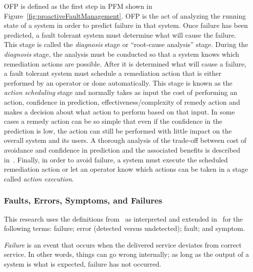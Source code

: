 
\ac{OFP} is defined as the first step in \ac{PFM} shown in
Figure~\ref{fig:proactiveFaultManagement}.  \ac{OFP} is the act of analyzing
the running state of a system in order to predict failure in that system. Once
failure has been predicted, a fault tolerant system must determine what will
cause the failure.  This stage is called the \emph{diagnosis} stage or
``root-cause analysis'' stage.  During the \emph{diagnosis} stage, the analysis
must be conducted so that a system knows which remediation actions are
possible.  After it is determined what will cause a failure, a fault tolerant
system must schedule a remediation action that is either performed by an
operator or done automatically.  This stage is known as the \emph{action
scheduling} stage and normally takes as input the cost of performing an action,
confidence in prediction, effectiveness/complexity of remedy action and makes a
decision about what action to perform based on that input.  In some cases a
remedy action can be so simple that even if the confidence in the prediction is
low, the action can still be performed with little impact on the overall system
and its users.  A thorough analysis of the trade-off between cost of avoidance
and confidence in prediction and the associated benefits is described
in~\cite{candea2004microreboot}.  Finally, in order to avoid failure, a system
must execute the scheduled remediation action or let an operator know which
actions can be taken in a stage called \emph{action execution}.

\subsubsection{Faults, Errors, Symptoms, and Failures}
This research uses the definitions from~\cite{avivzienis2004basic} as
interpreted and extended in~\cite{salfnerSurvey} for the following terms:
failure; error (detected versus undetected); fault; and symptom.

\emph{Failure} is an event that occurs when the delivered service deviates from
correct service.  In other words, things can go wrong internally; as long as
the output of a system is what is expected, failure has not occurred.  

